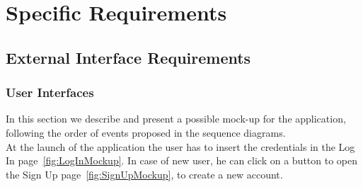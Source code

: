 \chapter{Specific Requirements}

\section{External Interface Requirements}

\subsection{User Interfaces}

In this section we describe and present a possible mock-up for the application, following the order of events proposed in the sequence diagrams.\\

At the launch of the application the user has to insert the credentials in the Log In page~\ref{fig:LogInMockup}. In case of new user, he can click on a button to open the Sign Up page~\ref{fig:SignUpMockup}, to create a new account.

